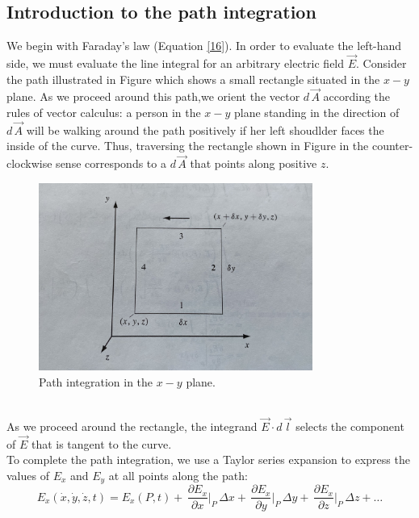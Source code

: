 \documentclass[12pt]{article}
\numberwithin{equation}{section}
\begin{document}
\subsection{Introduction to the path integration}
We begin with Faraday's law (Equation \eqref{16}). In order to evaluate the left-hand side, we must evaluate the line integral for an arbitrary electric field $\vec{E}$. Consider the path illustrated in Figure which shows a small rectangle situated in the $x-y$ plane.
As we proceed around this path,we orient the vector $d\,\vec{A}$ according the rules of vector calculus: a person in the $x-y$ plane standing in the direction of $d\,\vec{A}$ will be walking around the path positively if her left shoudlder faces the inside of the curve.
Thus, traversing the rectangle shown in Figure in the counter-clockwise sense corresponds to a $d\,\vec{A}$ that points along positive $z$.
\begin{figure}[h]
    \includegraphics[width=0.8\textwidth]{./pic/IMG_1365.jpeg}
    \centering
    \caption{Path integration in the $x-y$ plane.}
\end{figure}\\
\indent As we proceed around the rectangle, the integrand $\vec{E}\cdot d\,\vec{l}$ selects the component of $\vec{E}$ that is tangent to the curve.\\
\indent To complete the path integration, we use a Taylor series expansion  to express the values of $E_x$ and $E_y$ at all points along the path:
\[
    E_x(\dot{x},\dot{y},\dot{z},t)=E_x(P,t)+\,\frac{\partial{E_x}}{\partial{x}}\Big|_P\,\Delta x+\,\frac{\partial{E_x}}{\partial{y}}\Big|_P\,\Delta y+\,\frac{\partial{E_x}}{\partial{z}}\Big|_P\,\Delta z+\ldots 
\]
\end{document}

